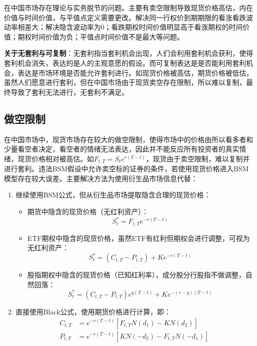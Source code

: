 \documentclass[11pt]{article}
\begin{document}
在中国市场存在理论与实务脱节的问题。主要有卖空限制导致现货价格高估，内在价值与时间价值，与平值点定义需要更改。解决同一行权价到期期限的看涨看跌波动率相差大；解决隐含波动率为0；看跌期权时间价值明显高于看涨期权的时间价值；期权时间价值为负；平值点时间价值不是最大等问题。

\textbf{关于无套利与可复制}：无套利指当套利机会出现，人们会利用套利机会获利，使得套利机会消失，表达的是人的主观意愿的假设。而可复制表达是是否能利用套利机会，表达是市场环境是否能允许套利进行。如现货价格被高估，期货价格被低估，虽然人们愿意进行套利，但在中国市场由于现货卖空存在限制，所以难以复制，最终导致了套利无法进行，无套利不满足。

\subsection{做空限制}

在中国市场中，现货市场存在较大的做空限制，使得市场中的价格由所以看多者和少量看空者决定，看空者的情绪无法表达，因此并不能反应所有投资者的真实情绪，现货价格相对被高估。如$F_{t,T}=S_t e^{r(T-t)}$，现货由于卖空限制，难以复制并进行套利。违法BSM假设中允许卖空标的证券的条件，若使用现货价格进入BSM模型存在较大误差。主要解决方法为使用衍生品市场信息代替：
\begin{enumerate}
    \item 继续使用BSM公式，但从衍生品市场提取隐含合理的现货价格：
    \begin{itemize}
        \item 期货中隐含的现货价格（无红利资产）：
        \begin{equation*}
            S^*_t = F_{t,T} e^{-r(T-t)}
        \end{equation*}
        \item ETF期权中隐含的现货价格，虽然ETF有红利但期权会进行调整，可视为无红利资产：
        \begin{equation*}
            S^*_t = \left( C_{t,T} - P_{t,T} \right) + Ke^{-r(T-t)}
        \end{equation*}
        \item 股指期权中隐含的现货价格（已知红利率），成分股分行股指不做调整，自然回落：
        \begin{equation*}
            S^*_t = \left( C_{t,T} - P_{t,T} \right)e^{q(T-t)} + Ke^{-(r-q)(T-t)}
        \end{equation*}
    \end{itemize}
    \item 直接使用Black公式，使用期货价格进行计算，即：
    \begin{align*}
        C_{t,T} &= e^{-r(T-t)} \left[ F_{t,T} N(d_1) - K N(d_2) \right] \\
        P_{t,T} &= e^{-r(T-t)} \left[ K N(-d_2) - F_{t,T} N(-d_1) \right]
    \end{align*}
\end{enumerate}
\end{document}
